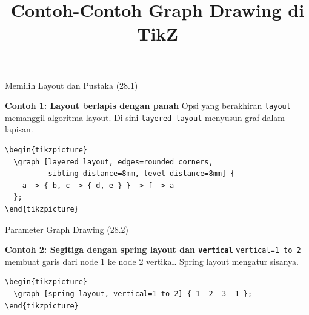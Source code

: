 \documentclass[aspectratio=169]{beamer}
\title{Contoh-Contoh Graph Drawing di TikZ}
\date{}
\begin{document}
\begin{frame}\titlepage\end{frame}


\begin{frame}{Memilih Layout dan Pustaka (28.1)}


\textbf{Contoh 1: Layout berlapis dengan panah}
Opsi yang berakhiran \texttt{layout} memanggil algoritma layout. Di sini \texttt{layered layout} menyusun graf dalam lapisan.
\begin{lstlisting}
\begin{tikzpicture}
  \graph [layered layout, edges=rounded corners,
          sibling distance=8mm, level distance=8mm] {
    a -> { b, c -> { d, e } } -> f -> a
  };
\end{tikzpicture}
\end{lstlisting}

\begin{center}\end{center}

% 

\end{frame}

\begin{frame}{Parameter Graph Drawing (28.2)}


\textbf{Contoh 2: Segitiga dengan spring layout dan \texttt{vertical}}
\texttt{vertical=1 to 2} membuat garis dari node 1 ke node 2 vertikal. Spring layout mengatur sisanya.
\begin{lstlisting}
\begin{tikzpicture}
  \graph [spring layout, vertical=1 to 2] { 1--2--3--1 };
\end{tikzpicture}
\end{lstlisting}
\begin{center}\end{center}



\end{frame}
\end{document}
